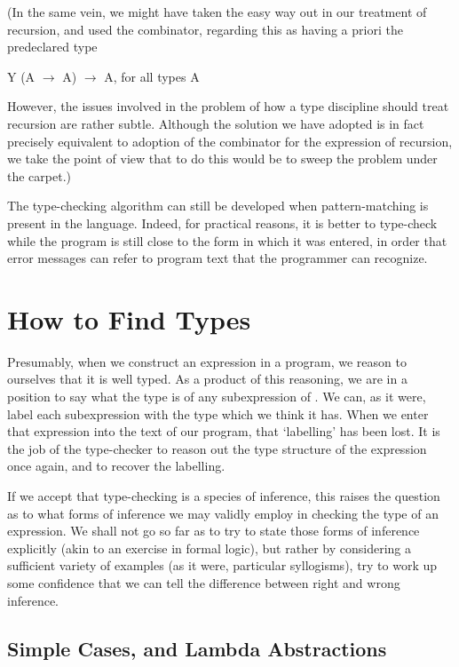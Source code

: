 (In the same vein, we might have taken the easy way out in our treatment of
recursion, and used the  combinator, regarding this as having a priori the
predeclared type
\begin{mlcoded}
    Y \hastype{} (A $\rightarrow$ A) $\rightarrow$ A, for all types A
\end{mlcoded}

However, the issues involved in the problem of how a type discipline should
treat recursion are rather subtle. Although the solution we have adopted is in
fact precisely equivalent to adoption of the  combinator for the expression of recursion, we take the point of view that to do this would be to sweep the
problem under the carpet.)

The type-checking algorithm can still be developed when pattern-matching
is present in the language. Indeed, for practical reasons, it is better to type-check while the program is still close to the form in which it was entered, in
order that error messages can refer to program text that the programmer can
recognize.

\section{How to Find Types}

Presumably, when we construct an expression  in a program, we reason to
ourselves that it is well typed. As a product of this reasoning, we are in a
position to say what the type is of any subexpression  of . We can, as it
were, label each subexpression with the type which we think it has. When we
enter that expression into the text of our program, that `labelling' has been
lost. It is the job of the type-checker to reason out the type structure of the
expression once again, and to recover the labelling.

If we accept that type-checking is a species of inference, this raises the
question as to what forms of inference we may validly employ in checking the
type of an expression. We shall not go so far as to try to state those forms of
inference explicitly (akin to an exercise in formal logic), but rather by
considering a sufficient variety of examples (as it were, particular syllogisms),
try to work up some confidence that we can tell the difference between right
and wrong inference.

\subsection{Simple Cases, and Lambda Abstractions}

